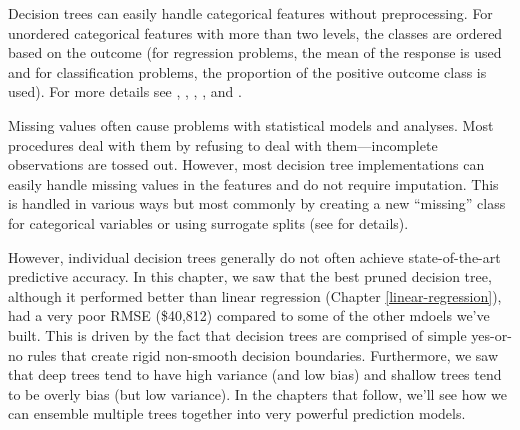 \documentclass[]{krantz}
\begin{document}
Decision trees can easily handle categorical features without preprocessing. For unordered categorical features with more than two levels, the classes are ordered based on the outcome (for regression problems, the mean of the response is used and for classification problems, the proportion of the positive outcome class is used). For more details see \citet{esl}, \citet{breiman1984nonlinear}, \citet{ripley2007pattern}, \citet{fisher1958grouping}, and \citet{loh1988tree}.

Missing values often cause problems with statistical models and analyses. Most procedures deal with them by refusing to deal with them---incomplete observations are tossed out. However, most decision tree implementations can easily handle missing values in the features and do not require imputation. This is handled in various ways but most commonly by creating a new ``missing'' class for categorical variables or using surrogate splits (see \citet{therneau1997introduction} for details).

However, individual decision trees generally do not often achieve state-of-the-art predictive accuracy. In this chapter, we saw that the best pruned decision tree, although it performed better than linear regression (Chapter \ref{linear-regression}), had a very poor RMSE (\$40,812) compared to some of the other mdoels we've built. This is driven by the fact that decision trees are comprised of simple yes-or-no rules that create rigid non-smooth decision boundaries. Furthermore, we saw that deep trees tend to have high variance (and low bias) and shallow trees tend to be overly bias (but low variance). In the chapters that follow, we'll see how we can ensemble multiple trees together into very powerful prediction models.



\backmatter
\printindex
\end{document}
